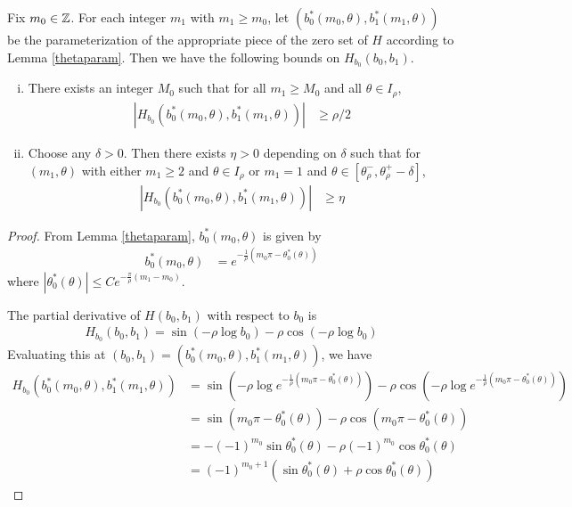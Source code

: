 \documentclass[thesis.tex]{subfiles}
\begin{document}
\begin{lemma}\label{Hderivbounds}
Fix $m_0 \in {\mathbb Z}$. For each integer $m_1$ with $m_1 \geq m_0$, let $(b_0^*(m_0, \theta), b_1^*(m_1, \theta))$ be the parameterization of the appropriate piece of the zero set of $H$ according to Lemma \ref{thetaparam}. Then we have the following bounds on $H_{b_0}(b_0, b_1)$.
\begin{enumerate}[(i)] 
\item There exists an integer $M_0$ such that for all $m_1 \geq M_0$ and all $\theta \in I_\rho$,
\begin{align}\label{derivbound1}
| H_{b_0}(b_0^*(m_0, \theta), b_1^*(m_1, \theta)) | &\geq \rho/2
\end{align}
\item Choose any $\delta > 0$. Then there exists $\eta > 0$ depending on $\delta$ such that for $(m_1, \theta)$ with either $m_1 \geq 2$ and $\theta \in I_\rho$ or $m_1 = 1$ and $\theta \in [\theta_\rho^-, \theta_\rho^+ - \delta]$,
\begin{align}\label{derivbound2}
| H_{b_0}(b_0^*(m_0, \theta), b_1^*(m_1, \theta)) | &\geq \eta
\end{align}
\end{enumerate}
\begin{proof}
From Lemma \ref{thetaparam}, $b_0^*(m_0, \theta)$ is given by
\begin{align}\label{b0starexp}
b_0^*(m_0, \theta) &= e^{-\frac{1}{\rho}(m_0 \pi - \theta_0^*(\theta)) }
\end{align}
where $|\theta_0^*(\theta)| \leq C e^{ -\frac{\pi}{\rho}(m_1 - m_0)}$.

The partial derivative of $H(b_0, b_1)$ with respect to $b_0$ is
\begin{align}\label{Hb0}
H_{b_0} (b_0, b_1) = \sin(-\rho \log b_0) - \rho \cos(-\rho \log b_0)
\end{align}
Evaluating this at $(b_0, b_1) = (b_0^*(m_0, \theta), b_1^*(m_1, \theta))$, we have 
\begin{align*}
H_{b_0}(b_0^*(m_0, \theta), b_1^*(m_1, \theta)) &= \sin\left(-\rho \log e^{-\frac{1}{\rho}(m_0 \pi - \theta_0^*(\theta))} \right) - \rho \cos\left(-\rho \log e^{-\frac{1}{\rho}(m_0 \pi - \theta_0^*(\theta))} \right) \\
&= \sin\left(m_0 \pi - \theta_0^*(\theta) \right) - \rho \cos\left(m_0 \pi - \theta_0^*(\theta) \right) \\
&= -(-1)^{m_0} \sin \theta_0^*(\theta) - \rho (-1)^{m_0} \cos \theta_0^*(\theta) \\
&= (-1)^{m_0+1} \left( \sin \theta_0^*(\theta) + \rho \cos \theta_0^*(\theta) \right)
\end{align*}


\end{proof}
\end{lemma}
\end{document}
